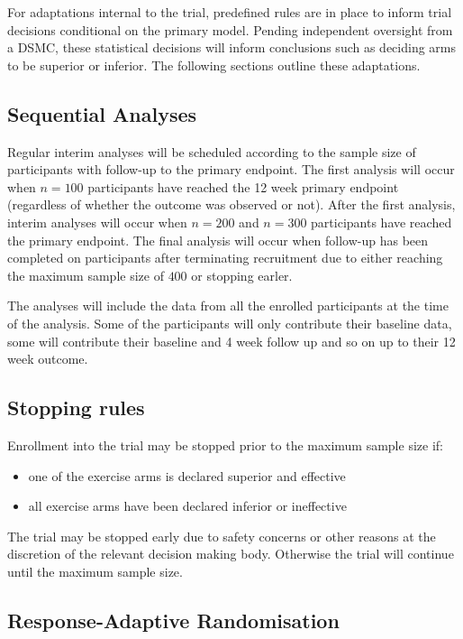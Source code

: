 \documentclass[11pt,parskip=half-]{scrartcl}
\providecommand{\tightlist}{%
  \setlength{\itemsep}{0pt}\setlength{\parskip}{0pt}}
\begin{document}
For adaptations internal to the trial, predefined rules are in place to inform trial decisions conditional on the primary model. Pending independent oversight from a DSMC, these statistical decisions will inform conclusions such as deciding arms to be superior or inferior. The following sections outline these adaptations.

\subsection{Sequential Analyses}\label{sequential-analyses}

Regular interim analyses will be scheduled according to the sample size of participants with follow-up to the primary endpoint. The first analysis will occur when \(n=100\) participants have reached the 12 week primary endpoint (regardless of whether the outcome was observed or not). After the first analysis, interim analyses will occur when $n=200$ and $n=300$ participants have reached the primary endpoint. The final analysis will occur when follow-up has been completed on participants after terminating recruitment due to either reaching the maximum sample size of \(400\) or stopping earler.

The analyses will include the data from all the enrolled participants at the time of the analysis. Some of the participants will only contribute their baseline data, some will contribute their baseline and 4 week follow up and so on up to their 12 week outcome.

\subsection{Stopping rules}\label{stopping-rules}

Enrollment into the trial may be stopped prior to the maximum sample size if:

\begin{itemize}\tightlist
  \item one of the exercise arms is declared superior and effective
  \item all exercise arms have been declared inferior or ineffective
\end{itemize}

The trial may be stopped early due to safety concerns or other reasons at the discretion of the relevant decision making body. Otherwise the trial will continue until the maximum sample size.

\subsection{Response-Adaptive Randomisation}\label{sec:response-adaptive-randomisation}
\end{document}
